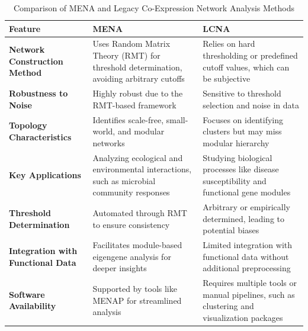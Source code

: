 \begin{table}[H]
\centering
\renewcommand{\arraystretch}{1.5} %
\begin{tabularx}{\textwidth}{@{}p{}X X@{}}
\toprule
\textbf{Feature} & \textbf{MENA} & \textbf{LCNA} \\
\midrule
\textbf{Network Construction Method} &
Uses Random Matrix Theory (RMT) for threshold determination, avoiding arbitrary cutoffs\cite{deng_molecular_2012} &
Relies on hard thresholding or predefined cutoff values, which can be subjective\cite{butte_discovering_2000} \\

\textbf{Robustness to Noise} &
Highly robust due to the RMT-based framework\cite{deng_molecular_2012} &
Sensitive to threshold selection and noise in data\cite{deng_molecular_2012} \\

\textbf{Topology Characteristics} &
Identifies scale-free, small-world, and modular networks\cite{deng_molecular_2012} &
Focuses on identifying clusters but may miss modular hierarchy\cite{horvath_analysis_2006} \\

\textbf{Key Applications} &
Analyzing ecological and environmental interactions, such as microbial community responses\cite{deng_molecular_2012} &
Studying biological processes like disease susceptibility and functional gene modules\cite{butte_discovering_2000,zhang_general_2005} \\

\textbf{Threshold Determination} &
Automated through RMT to ensure consistency\cite{deng_molecular_2012} &
Arbitrary or empirically determined, leading to potential biases\cite{deng_molecular_2012} \\

\textbf{Integration with Functional Data} &
Facilitates module-based eigengene analysis for deeper insights\cite{deng_molecular_2012} &
Limited integration with functional data without additional preprocessing\cite{chen_variations_2008} \\

\textbf{Software Availability} &
Supported by tools like MENAP for streamlined analysis\cite{deng_molecular_2012} &
Requires multiple tools or manual pipelines, such as clustering and visualization packages\cite{deng_molecular_2012} \\
\bottomrule
\end{tabularx}
\caption{Comparison of MENA and Legacy Co-Expression Network Analysis Methods}
\label{tab:mena_vs_lcna}
\end{table}


